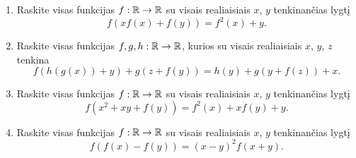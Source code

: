 \begin{enumerate}
  \item Raskite visas funkcijas $f: \mathbb R \to \mathbb R$ su visais realiaisiais $x$,
    $y$ tenkinančias lygtį $$f(xf(x)+f(y))=f^2(x)+y.$$
  \item Raskite visas funkcijas $f,g,h:\mathbb R\to\mathbb R$, kurios su visais
    realiaisiais $x$, $y$, $z$ tenkina $$f(h(g(x))
    +y)+g(z+f(y))=h(y)+g(y+f(z))+x.$$
 \item Raskite visas funkcijas $f: \mathbb R \to \mathbb R$ su visais realiaisiais $x$,
    $y$ tenkinančias lygtį $$f(x^2 + xy +f(y))=f^2(x)+xf(y)+y.$$
  \item Raskite visas funkcijas $f: \mathbb R \to \mathbb R$ su visais realiaisiais $x$,
    $y$ tenkinančias lygtį $$f(f(x)-f(y))=(x-y)^2f(x+y).$$

\end{enumerate}
